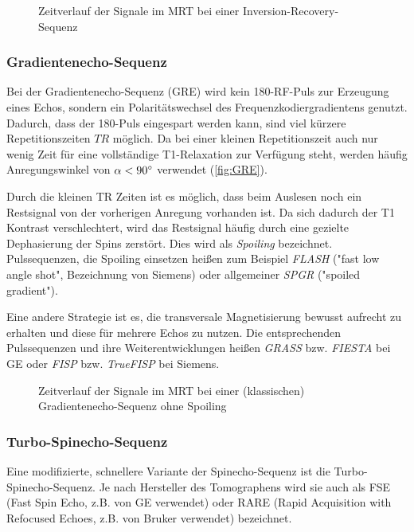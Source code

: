 \begin{figure}[H]
	\centering
	\caption[Inversion-Recovery-Sequenz]{Zeitverlauf der Signale im MRT bei einer Inversion-Recovery-Sequenz}
	\label{fig:IR}
\end{figure}

\subsubsection{Gradientenecho-Sequenz}
Bei der Gradientenecho-Sequenz (GRE) wird kein 180\degree-RF-Puls zur Erzeugung eines Echos, sondern ein Polaritätswechsel des Frequenzkodiergradientens genutzt. Dadurch, dass der 180\degree-Puls eingespart werden kann, sind viel kürzere Repetitionszeiten $TR$ möglich. Da bei einer kleinen Repetitionszeit auch nur wenig Zeit für eine vollständige T1-Relaxation zur Verfügung steht, werden häufig Anregungswinkel von $\alpha<90\degree$ verwendet (\autoref{fig:GRE}).

Durch die kleinen TR Zeiten ist es möglich, dass beim Auslesen noch ein Restsignal von der vorherigen Anregung vorhanden ist. Da sich dadurch der T1 Kontrast verschlechtert, wird das Restsignal häufig durch eine gezielte Dephasierung der Spins zerstört. Dies wird als \textit{Spoiling} bezeichnet. Pulssequenzen, die Spoiling einsetzen heißen zum Beispiel \textit{FLASH} ("fast low angle shot", Bezeichnung von Siemens) oder allgemeiner \textit{SPGR} ("spoiled gradient").

Eine andere Strategie ist es, die transversale Magnetisierung bewusst aufrecht zu erhalten und diese für mehrere Echos zu nutzen. Die entsprechenden Pulssequenzen und ihre Weiterentwicklungen heißen \textit{GRASS} bzw. \textit{FIESTA} bei GE oder \textit{FISP} bzw. \textit{TrueFISP} bei Siemens.

\begin{figure}[H]
	\centering
	\caption[Gradientenecho-Sequenz]{Zeitverlauf der Signale im MRT bei einer (klassischen) Gradientenecho-Sequenz ohne Spoiling}
	\label{fig:GRE}
\end{figure}

\subsubsection{Turbo-Spinecho-Sequenz}
Eine modifizierte, schnellere Variante der Spinecho-Sequenz ist die Turbo-Spinecho-Sequenz. Je nach Hersteller des Tomographens wird sie auch als FSE (Fast Spin Echo, z.B. von GE verwendet) oder RARE (Rapid Acquisition with Refocused Echoes, z.B. von Bruker verwendet) bezeichnet.

